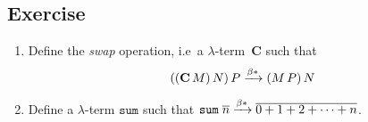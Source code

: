 \subsection*{Exercise}
\begin{enumerate}
  \item Define the \emph{swap} operation, i.e\ a $\lambda$-term~$\mathbf{C}$
    such that
    \[
      ((\mathbf{C}\,M)\,N)\,P
      \xrightarrow{\beta*} (M\,P)\,N
    \]
  \item Define a $\lambda$-term $\mathtt{sum}$ such that
    $\mathtt{sum}\;\overline{n} \xrightarrow{\beta*} \overline{0 + 1 + 2 + \dots + n}$.
\end{enumerate}

 

